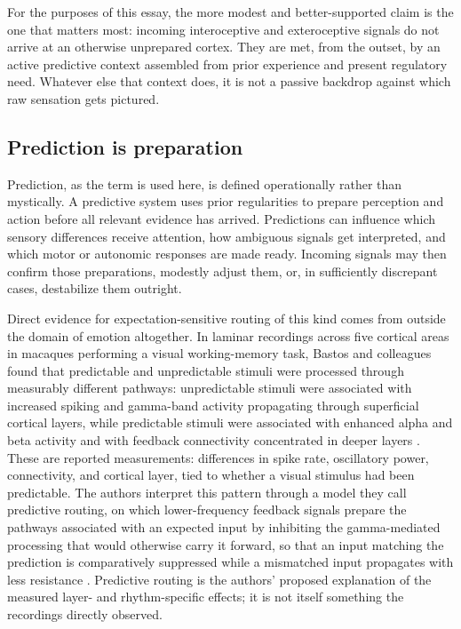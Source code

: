 \documentclass[11pt]{article}
\begin{document}
For the purposes of this essay, the more modest and better-supported claim is the one that matters most: incoming interoceptive and exteroceptive signals do not arrive at an otherwise unprepared cortex. They are met, from the outset, by an active predictive context assembled from prior experience and present regulatory need. Whatever else that context does, it is not a passive backdrop against which raw sensation gets pictured.

\subsection{Prediction is preparation}

Prediction, as the term is used here, is defined operationally rather than mystically. A predictive system uses prior regularities to prepare perception and action before all relevant evidence has arrived. Predictions can influence which sensory differences receive attention, how ambiguous signals get interpreted, and which motor or autonomic responses are made ready. Incoming signals may then confirm those preparations, modestly adjust them, or, in sufficiently discrepant cases, destabilize them outright.

Direct evidence for expectation-sensitive routing of this kind comes from outside the domain of emotion altogether. In laminar recordings across five cortical areas in macaques performing a visual working-memory task, Bastos and colleagues found that predictable and unpredictable stimuli were processed through measurably different pathways: unpredictable stimuli were associated with increased spiking and gamma-band activity propagating through superficial cortical layers, while predictable stimuli were associated with enhanced alpha and beta activity and with feedback connectivity concentrated in deeper layers \citep{Bastos2020}. These are reported measurements: differences in spike rate, oscillatory power, connectivity, and cortical layer, tied to whether a visual stimulus had been predictable. The authors interpret this pattern through a model they call predictive routing, on which lower-frequency feedback signals prepare the pathways associated with an expected input by inhibiting the gamma-mediated processing that would otherwise carry it forward, so that an input matching the prediction is comparatively suppressed while a mismatched input propagates with less resistance \citep{Bastos2020}. Predictive routing is the authors' proposed explanation of the measured layer- and rhythm-specific effects; it is not itself something the recordings directly observed.
\end{document}
